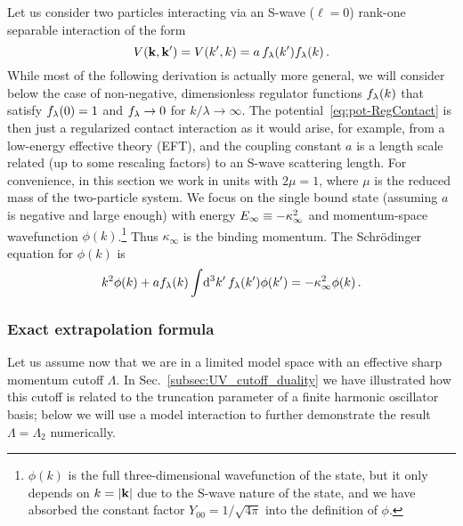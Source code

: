 	Let us consider two particles interacting via an S-wave ($\ell=0$) rank-one
	separable interaction of the form
	\begin{equation}
	V(\mathbf{k},\mathbf{k}') = V(k',k) = a\,f_{\lambda}(k') f_{\lambda}(k) \,.
	\label{eq:pot-RegContact}
	\end{equation}
	While most of the following derivation is actually more general, we
	will consider below the case of non-negative, dimensionless regulator
	functions $f_{\lambda}(k)$ that satisfy $f_{\lambda}(0)=1$ and $f_{\lambda}\to 0$ for
	$k/\lambda\to\infty$.  The potential~\eqref{eq:pot-RegContact} is then
	just a regularized contact interaction as it would arise, for example,
	from a low-energy effective theory (EFT), and the coupling constant
	$a$ is a length scale related (up to some rescaling factors) to an
	S-wave scattering length.  For convenience, in this section we work in
	units with $2\mu=1$, where $\mu$ is the reduced mass of the
	two-particle system.  We focus on the single bound state (assuming $a$
	is negative and large enough) with energy $E_{\infty} \equiv -\kappa_{\infty}^2$
	and momentum-space wavefunction $\phi(k)$.\footnote{$\phi(k)$ is the
  full three-dimensional wavefunction of the state, but it only
  depends on $k=|\mathbf{k}|$ due to the S-wave nature of the state, and we
  have absorbed the constant factor $Y_{00}=1/\sqrt{4\pi}$ into the
  definition of $\phi$.}  Thus $\kappa_\infty$ is the binding
	momentum.  The Schr{\"o}dinger equation for $\phi(k)$ is
	\begin{equation}
	 k^2 \phi(k) + a  f_{\lambda}(k) \int\! \mathrm{d}^3k'\, f_{\lambda}(k')\phi(k')
	 = -\kappa_\infty^2 \phi(k) \,.
	\label{eq:haminfty}
	\end{equation}

	\medskip
	\subsubsection{Exact extrapolation formula}

	Let us assume now that we are in a limited model space with an
	effective sharp momentum cutoff $\Lambda$.  In
	Sec.~\ref{subsec:UV_cutoff_duality}
	we have illustrated how this cutoff is related to the truncation
	parameter of a finite harmonic oscillator basis; below we will use a
	model interaction to further demonstrate the result
	$\Lambda=\Lambda_2$ numerically.

